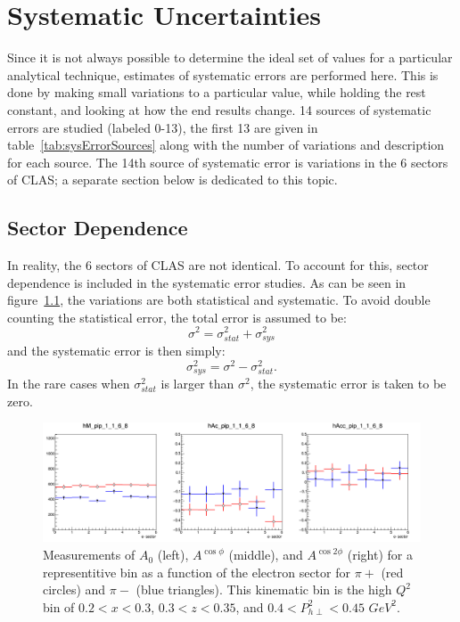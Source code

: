 \chapter{Systematic Uncertainties}
\label{cha:SystematicUncertainties}

Since it is not always possible to determine the ideal set of values for a particular analytical technique, estimates of systematic errors are performed here.
This is done by making small variations to a particular value, while holding the rest constant, and looking at how the end results change.
14 sources of systematic errors are studied (labeled 0-13), the first 13 are given in table~\ref{tab:sysErrorSources} along with the number of variations and description for each source.
The 14th source of systematic error is variations in the 6 sectors of CLAS; a separate section below is dedicated to this topic.

\section{Sector Dependence}
\label{sec:SectorDependence}
In reality, the 6 sectors of CLAS are not identical.
To account for this, sector dependence is included in the systematic error studies.
As can be seen in figure~\ref{fig:sectorDep_0_1_4_3}, the variations are both statistical and systematic.
To avoid double counting the statistical error, the total error is assumed to be:
%
\begin{equation}
\label{eq:totalError_stat_sys}
\sigma^2 = \sigma^2_{stat} + \sigma^2_{sys}
\end{equation}
%
and the systematic error is then simply:
%
\begin{equation}
\label{eq:sysError_sectorDep}
\sigma^2_{sys} = \sigma^2 - \sigma^2_{stat}.
\end{equation}
%
In the rare cases when $\sigma^2_{stat}$ is larger than $\sigma^2$, the systematic error is taken to be zero.
%
\begin{figure}[htp]
\centering
\includegraphics[width=6in]{figures/sectorDep_1_1_6_8.png}
\caption{Measurements of $A_0$ (left), $A^{\cos\phi}$ (middle), and $A^{\cos2\phi}$ (right) for a representitive bin as a function of the electron sector for $\pi+$ (red circles) and $\pi-$ (blue triangles). This kinematic bin is the high $Q^2$ bin of $0.2 < x < 0.3$, $0.3 < z < 0.35$, and $0.4 < P_{h\perp}^2 < 0.45$ $GeV^2$.}
\label{fig:sectorDep_0_1_4_3}
\end{figure}
%


